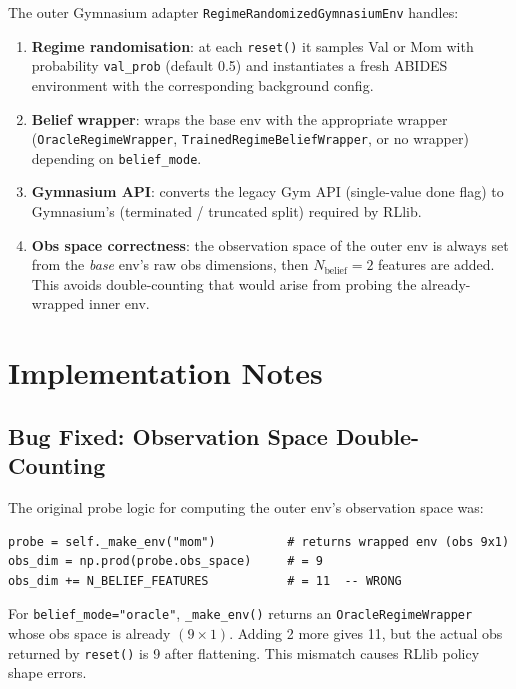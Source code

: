 \documentclass[11pt]{article}
\begin{document}
The outer Gymnasium adapter \texttt{RegimeRandomizedGymnasiumEnv} handles:

\begin{enumerate}[nosep]
  \item \textbf{Regime randomisation}: at each \texttt{reset()} it samples
        Val or Mom with probability \texttt{val\_prob} (default 0.5) and
        instantiates a fresh ABIDES environment with the corresponding
        background config.
  \item \textbf{Belief wrapper}: wraps the base env with the appropriate
        wrapper (\texttt{OracleRegimeWrapper}, \texttt{TrainedRegimeBeliefWrapper},
        or no wrapper) depending on \texttt{belief\_mode}.
  \item \textbf{Gymnasium API}: converts the legacy Gym API (single-value
        done flag) to Gymnasium's (terminated / truncated split) required
        by RLlib.
  \item \textbf{Obs space correctness}: the observation space of the outer
        env is always set from the \emph{base} env's raw obs dimensions, then
        $N_\text{belief} = 2$ features are added.  This avoids double-counting
        that would arise from probing the already-wrapped inner env.
\end{enumerate}

\section{Implementation Notes}

\subsection{Bug Fixed: Observation Space Double-Counting}

The original probe logic for computing the outer env's observation space was:

\begin{verbatim}
probe = self._make_env("mom")          # returns wrapped env (obs 9x1)
obs_dim = np.prod(probe.obs_space)     # = 9
obs_dim += N_BELIEF_FEATURES           # = 11  -- WRONG
\end{verbatim}

For \texttt{belief\_mode="oracle"}, \texttt{\_make\_env()} returns an
\texttt{OracleRegimeWrapper} whose obs space is already $(9 \times 1)$.
Adding 2 more gives 11, but the actual obs returned by \texttt{reset()} is 9
after flattening.  This mismatch causes RLlib policy shape errors.
\end{document}
